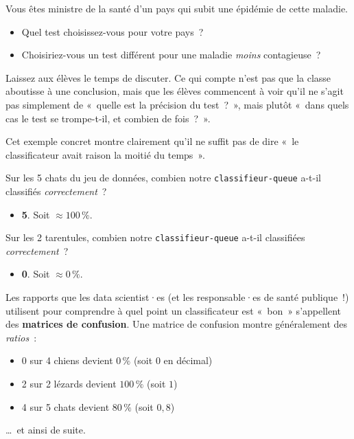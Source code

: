 \documentclass[12pt,a4paper]{article}
\begin{document}
\begin{thinkbox}
  Vous êtes ministre de la santé d'un pays qui subit une épidémie de cette maladie.
  \begin{itemize}
    \item Quel test choisissez-vous pour votre pays~?
    \item Choisiriez-vous un test différent pour une maladie \emph{moins} contagieuse~?
  \end{itemize}

  Laissez aux élèves le temps de discuter. Ce qui compte n'est pas que la classe aboutisse à une conclusion, mais que les élèves commencent à voir qu'il ne s'agit pas simplement de «~quelle est la précision du test~?~», mais plutôt «~dans quels cas le test se trompe-t-il, et combien de fois~?~».
\end{thinkbox}

\begin{keypointbox}
  Cet exemple concret montre clairement qu'il ne suffit pas de dire «~le classificateur avait raison la moitié du temps~».

  Sur les 5 chats du jeu de données, combien notre \texttt{classifieur-queue} a-t-il classifiés \emph{correctement}~?
  \begin{itemize}
    \item \textbf{5}. Soit $\approx 100\,\%$.
  \end{itemize}
  Sur les 2 tarentules, combien notre \texttt{classifieur-queue} a-t-il classifiées \emph{correctement}~?
  \begin{itemize}
    \item \textbf{0}. Soit $\approx 0\,\%$.
  \end{itemize}

  Les rapports que les data scientist·es (et les responsable·es de santé publique~!) utilisent pour comprendre à quel point un classificateur est «~bon~» s'appellent des \textbf{matrices de confusion}. Une matrice de confusion montre généralement des \emph{ratios}~:
  \begin{itemize}
    \item 0 sur 4 chiens devient $0\,\%$ (soit $0$ en décimal)
    \item 2 sur 2 lézards devient $100\,\%$ (soit $1$)
    \item 4 sur 5 chats devient $80\,\%$ (soit $0{,}8$)
  \end{itemize}
  …~et ainsi de suite.
\end{keypointbox}

\end{document}
